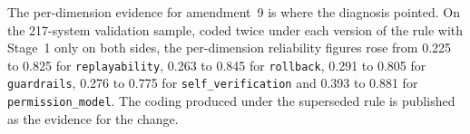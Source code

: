 The per-dimension evidence for amendment~9 is where the diagnosis pointed. On the 217-system validation
sample, coded twice under each version of the rule with Stage~1 only on both sides, the per-dimension
reliability figures rose from 0.225 to 0.825 for \texttt{replayability}, 0.263 to 0.845 for \texttt{rollback}, 0.291 to 0.805 for
\texttt{guardrails}, 0.276 to 0.775 for \texttt{self\_verification} and 0.393 to 0.881 for
\texttt{permission\_model}. The coding produced under the superseded rule is published as the evidence for
the change.
